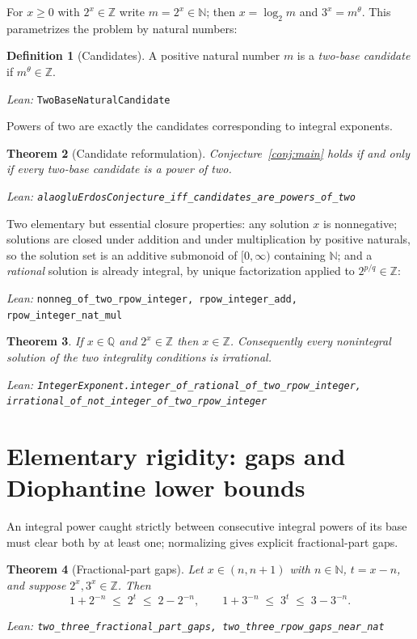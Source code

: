 \documentclass[11pt]{article}
\newtheorem{theorem}{Theorem}[section]
\theoremstyle{definition}
\newtheorem{definition}[theorem]{Definition}
\theoremstyle{remark}
\newcommand{\Z}{\mathbb{Z}}
\newcommand{\N}{\mathbb{N}}
\newcommand{\Q}{\mathbb{Q}}
\newcommand{\thetaq}{\theta}
\newcommand{\lean}[1]{\par\smallskip\noindent\begingroup\footnotesize\raggedright\emph{Lean:} \texttt{#1}\par\endgroup}
\begin{document}
For $x\ge 0$ with $2^x\in\Z$ write $m=2^x\in\N$; then $x=\log_2 m$ and
$3^x=m^{\thetaq}$. This parametrizes the problem by natural numbers:

\begin{definition}[Candidates]\label{def:candidate}
A positive natural number $m$ is a \emph{two-base candidate} if $m^{\thetaq}\in\Z$.
\lean{TwoBaseNaturalCandidate}
\end{definition}

Powers of two are exactly the candidates corresponding to integral exponents.

\begin{theorem}[Candidate reformulation]\label{thm:reform}
Conjecture~\ref{conj:main} holds if and only if every two-base candidate is a power of two.
\lean{alaogluErdosConjecture\_iff\_candidates\_are\_powers\_of\_two}
\end{theorem}

Two elementary but essential closure properties: any solution $x$ is nonnegative;
solutions are closed under addition and under multiplication by positive naturals, so the
solution set is an additive submonoid of $[0,\infty)$ containing $\N$; and a
\emph{rational} solution is already integral, by unique factorization applied to
$2^{p/q}\in\Z$:
\lean{nonneg\_of\_two\_rpow\_integer, rpow\_integer\_add, rpow\_integer\_nat\_mul}

\begin{theorem}\label{thm:rational}
If $x\in\Q$ and $2^x\in\Z$ then $x\in\Z$. Consequently every nonintegral solution of the two
integrality conditions is irrational.
\lean{IntegerExponent.integer\_of\_rational\_of\_two\_rpow\_integer,
irrational\_of\_not\_integer\_of\_two\_rpow\_integer}
\end{theorem}

\section{Elementary rigidity: gaps and Diophantine lower bounds}\label{sec:gaps}

An integral power caught strictly between consecutive integral powers of its base must clear
both by at least one; normalizing gives explicit fractional-part gaps.

\begin{theorem}[Fractional-part gaps]\label{thm:gaps}
Let $x\in(n,n+1)$ with $n\in\N$, $t=x-n$, and suppose $2^x,3^x\in\Z$. Then
\[
1+2^{-n}\;\le\; 2^{t}\;\le\; 2-2^{-n},
\qquad
1+3^{-n}\;\le\; 3^{t}\;\le\; 3-3^{-n}.
\]
\lean{two\_three\_fractional\_part\_gaps, two\_three\_rpow\_gaps\_near\_nat}
\end{theorem}
\end{document}
